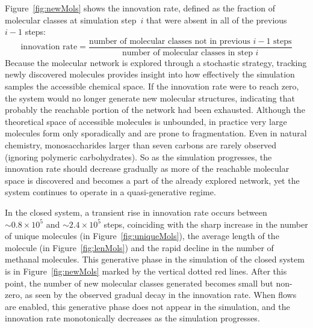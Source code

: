Figure~\ref{fig:newMols} shows the innovation rate, defined as the fraction of molecular classes at simulation step~$i$ that were absent in all of the previous~$i-1$ steps:
\begin{equation*}
    \text{innovation rate} = \frac{\text{number of molecular classes not in previous $i-1$ steps}}{\text{number of molecular classes in step }i}
\end{equation*}
Because the molecular network is explored through a stochastic strategy, tracking newly discovered molecules provides insight into how effectively the simulation samples the accessible chemical space. If the innovation rate were to reach zero, the system would no longer generate new molecular structures, indicating that probably the reachable portion of the network had been exhausted. Although the theoretical space of accessible molecules is unbounded, in practice very large molecules form only sporadically and are prone to fragmentation. Even in natural chemistry, monosaccharides larger than seven carbons are rarely observed (ignoring polymeric carbohydrates). So as the simulation progresses, the innovation rate should decrease gradually as more of the reachable molecular space is discovered and becomes a part of the already explored network, yet the system continues to operate in a quasi-generative regime.

In the closed system, a transient rise in innovation rate occurs between $\sim 0.8\times 10^5$ and $\sim 2.4\times 10^5$ steps, coinciding with the sharp increase in the number of unique molecules (in Figure~\ref{fig:uniqueMols}), the average length of the molecule (in Figure~\ref{fig:lenMols}) and the rapid decline in the number of methanal molecules. This generative phase in the simulation of the closed system is in Figure~\ref{fig:newMols} marked by the vertical dotted red lines. After this point, the number of new molecular classes generated becomes small but non-zero, as seen by the observed gradual decay in the innovation rate.
When flows are enabled, this generative phase does not appear in the simulation, and the innovation rate monotonically decreases as the simulation progresses.

